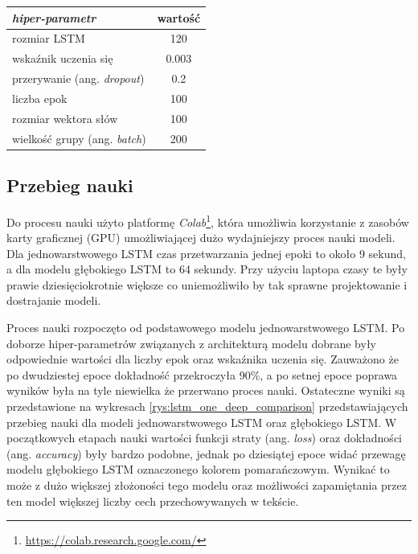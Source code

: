 \begin{table}[t]
\label{tab:parametry_lstm}
\centering\footnotesize%
\begin{tabular}{l c}
\toprule
\textit{hiper-parametr} & wartość \\
\midrule
rozmiar LSTM   & 120 \\
wskaźnik uczenia się   & 0.003 \\
przerywanie (ang. \textit{dropout})   & 0.2 \\
liczba epok   & 100 \\
rozmiar wektora słów   & 100 \\
wielkość grupy (ang. \textit{batch}) & 200 \\
\bottomrule
\end{tabular}
\end{table}

\subsection{Przebieg nauki}

Do procesu nauki użyto platformę \textit{Colab}\footnote{\url{https://colab.research.google.com/}}, która umożliwia korzystanie z zasobów karty graficznej (GPU) umożliwiającej dużo wydajniejszy proces nauki modeli. Dla jednowarstwowego LSTM czas przetwarzania jednej epoki to około 9 sekund, a dla modelu głębokiego LSTM to 64 sekundy. Przy użyciu laptopa czasy te były prawie dziesięciokrotnie większe co uniemożliwiło by tak sprawne projektowanie i dostrajanie modeli.

Proces nauki rozpoczęto od podstawowego modelu jednowarstwowego LSTM. Po doborze hiper-parametrów związanych z architekturą modelu dobrane były odpowiednie wartości dla liczby epok oraz wskaźnika uczenia się. Zauważono że po dwudziestej epoce dokładność przekroczyła 90\%, a po setnej epoce poprawa wyników była na tyle niewielka że przerwano proces nauki. Ostateczne wyniki są przedstawione na wykresach \ref{rys:lstm_one_deep_comparison} przedstawiających przebieg nauki dla modeli jednowarstwowego LSTM oraz głębokiego LSTM. W początkowych etapach nauki wartości funkcji straty (ang. \textit{loss}) oraz dokładności (ang. \textit{accuracy}) były bardzo podobne, jednak po dziesiątej epoce widać przewagę modelu głębokiego LSTM oznaczonego kolorem pomarańczowym. Wynikać to może z dużo większej złożoności tego modelu oraz możliwości zapamiętania przez ten model większej liczby cech przechowywanych w tekście.

